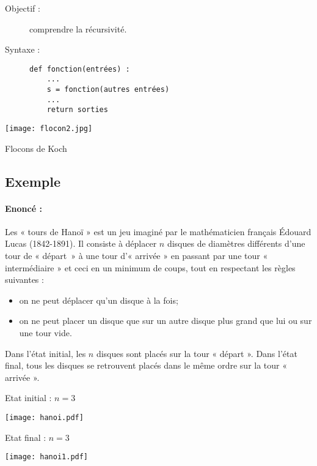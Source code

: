 \noindent\begin{minipage}{7cm}
\begin{description}
\item[Objectif :] comprendre la récursivité.
\item[Syntaxe \python :] \mbox{}
\begin{Verbatim}
def fonction(entrées) :
    ...
    s = fonction(autres entrées)
    ...
    return sorties
\end{Verbatim}
\end{description}
\end{minipage}
\mbox{}\hfill
\begin{minipage}{5cm}
\centerline{\texttt{[image: flocon2.jpg]}}
\centerline{Flocons de Koch}
\end{minipage}

\subsection{Exemple}

\paragraph{Enoncé :} 
Les « tours de Hanoï » est un jeu imaginé par le mathématicien 
français Édouard Lucas (1842-1891). Il 
consiste à déplacer $n$ disques de diamètres différents d'une 
tour de « départ~» à une tour d'« arrivée » en passant par une 
tour « intermédiaire » et ceci en un minimum de coups, 
tout en respectant les règles suivantes :
\begin{itemize}
\item on ne peut déplacer qu'un disque à la fois;
\item on ne peut placer un disque que sur un autre disque 
	plus grand que lui ou sur une tour vide.
\end{itemize}
Dans l'état initial, les $n$ disques sont placés sur la tour
« départ ». Dans l'état final, tous les disques se retrouvent
placés dans le même ordre sur la tour « arrivée ».
\vspace*{3mm}

\noindent\begin{minipage}{7cm}
{Etat initial : $n=3$}\\[1mm]
\centerline{\texttt{[image: hanoi.pdf]}}
\end{minipage}
\hfill
\begin{minipage}{7cm}
{Etat final : $n=3$}\\[1mm]
\centerline{\texttt{[image: hanoi1.pdf]}}
\end{minipage}
\vspace*{3mm}

